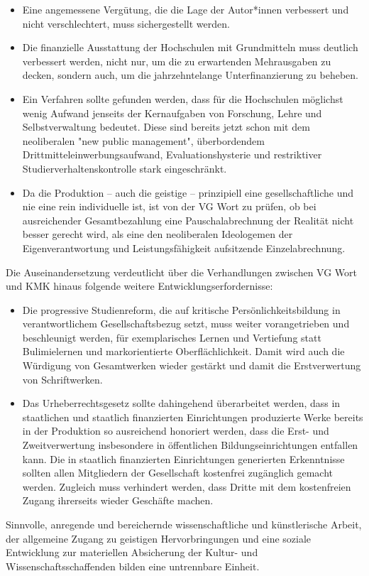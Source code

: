 \documentclass[ngerman,headheight=70pt]{scrartcl}
\begin{document}
    \begin{itemize}
        \item Eine angemessene Vergütung, die die Lage der Autor*innen verbessert
              und nicht verschlechtert, muss sichergestellt werden.
        \item Die finanzielle Ausstattung der Hochschulen mit Grundmitteln muss
            deutlich verbessert werden, nicht nur, um die zu erwartenden Mehrausgaben
            zu decken, sondern auch, um die jahrzehntelange Unterfinanzierung zu
            beheben.
        \item Ein Verfahren sollte gefunden werden, dass für die Hochschulen
        möglichst wenig Aufwand jenseits der Kernaufgaben von Forschung, Lehre und
        Selbstverwaltung bedeutet. Diese sind bereits jetzt schon mit dem
        neoliberalen "new public management", überbordendem
        Drittmitteleinwerbungsaufwand, Evaluationshysterie und restriktiver
        Studierverhaltenskontrolle stark eingeschränkt.
        \item Da die Produktion -- auch die geistige -- prinzipiell eine
        gesellschaftliche und nie eine rein individuelle ist, ist von der VG
        Wort zu prüfen, ob bei ausreichender Gesamtbezahlung eine Pauschalabrechnung
        der Realität nicht besser gerecht wird, als eine den neoliberalen Ideologemen
        der Eigenverantwortung und Leistungsfähigkeit aufsitzende Einzelabrechnung.
    \end{itemize}

    Die Auseinandersetzung verdeutlicht über die Verhandlungen zwischen VG Wort
    und KMK hinaus folgende weitere Entwicklungserfordernisse:
    \begin{itemize}
        \item Die progressive Studienreform, die auf kritische Persönlichkeitsbildung
        in verantwortlichem Gesellschaftsbezug setzt, muss weiter vorangetrieben
        und beschleunigt werden, für exemplarisches Lernen und Vertiefung statt
        Bulimielernen und markorientierte Oberflächlichkeit. Damit wird auch die
        Würdigung von Gesamtwerken wieder gestärkt und damit die Erstverwertung
        von Schriftwerken.
        \item Das Urheberrechtsgesetz sollte dahingehend überarbeitet werden, dass
        in staatlichen und staatlich finanzierten Einrichtungen produzierte Werke
        bereits in der Produktion so ausreichend honoriert werden, dass die Erst-
        und Zweitverwertung insbesondere in öffentlichen Bildungseinrichtungen
        entfallen kann. Die in staatlich finanzierten Einrichtungen generierten
        Erkenntnisse sollten allen Mitgliedern der Gesellschaft kostenfrei
        zugänglich gemacht werden. Zugleich muss verhindert werden, dass Dritte
        mit dem kostenfreien Zugang ihrerseits wieder Geschäfte machen.
    \end{itemize}

    Sinnvolle, anregende und bereichernde wissenschaftliche und künstlerische Arbeit,
    der allgemeine Zugang zu geistigen Hervorbringungen und eine soziale Entwicklung
    zur materiellen Absicherung der Kultur- und Wissenschaftsschaffenden bilden
    eine untrennbare Einheit.
\end{document}
